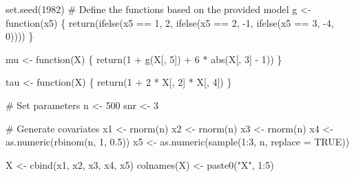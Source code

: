 \documentclass[
  letterpaper,
  DIV=11,
  numbers=noendperiod]{scrreprt}
\newenvironment{Shaded}{\begin{snugshade}}{\end{snugshade}}
\newcommand{\AttributeTok}[1]{\textcolor[rgb]{0.40,0.45,0.13}{#1}}
\newcommand{\CommentTok}[1]{\textcolor[rgb]{0.37,0.37,0.37}{#1}}
\newcommand{\ConstantTok}[1]{\textcolor[rgb]{0.56,0.35,0.01}{#1}}
\newcommand{\ControlFlowTok}[1]{\textcolor[rgb]{0.00,0.23,0.31}{#1}}
\newcommand{\DecValTok}[1]{\textcolor[rgb]{0.68,0.00,0.00}{#1}}
\newcommand{\FloatTok}[1]{\textcolor[rgb]{0.68,0.00,0.00}{#1}}
\newcommand{\FunctionTok}[1]{\textcolor[rgb]{0.28,0.35,0.67}{#1}}
\newcommand{\NormalTok}[1]{\textcolor[rgb]{0.00,0.23,0.31}{#1}}
\newcommand{\OtherTok}[1]{\textcolor[rgb]{0.00,0.23,0.31}{#1}}
\newcommand{\SpecialCharTok}[1]{\textcolor[rgb]{0.37,0.37,0.37}{#1}}
\newcommand{\StringTok}[1]{\textcolor[rgb]{0.13,0.47,0.30}{#1}}
\begin{document}
\begin{Shaded}
\begin{Highlighting}[]
\FunctionTok{set.seed}\NormalTok{(}\DecValTok{1982}\NormalTok{)}
\CommentTok{\# Define the functions based on the provided model}
\NormalTok{g }\OtherTok{\textless{}{-}} \ControlFlowTok{function}\NormalTok{(x5) \{}
  \FunctionTok{return}\NormalTok{(}\FunctionTok{ifelse}\NormalTok{(x5 }\SpecialCharTok{==} \DecValTok{1}\NormalTok{, }\DecValTok{2}\NormalTok{, }\FunctionTok{ifelse}\NormalTok{(x5 }\SpecialCharTok{==} \DecValTok{2}\NormalTok{, }\SpecialCharTok{{-}}\DecValTok{1}\NormalTok{, }\FunctionTok{ifelse}\NormalTok{(x5 }\SpecialCharTok{==} \DecValTok{3}\NormalTok{, }\SpecialCharTok{{-}}\DecValTok{4}\NormalTok{, }\DecValTok{0}\NormalTok{))))}
\NormalTok{\}}

\NormalTok{mu }\OtherTok{\textless{}{-}} \ControlFlowTok{function}\NormalTok{(X) \{}
  \FunctionTok{return}\NormalTok{(}\DecValTok{1} \SpecialCharTok{+} \FunctionTok{g}\NormalTok{(X[, }\DecValTok{5}\NormalTok{]) }\SpecialCharTok{+} \DecValTok{6} \SpecialCharTok{*} \FunctionTok{abs}\NormalTok{(X[, }\DecValTok{3}\NormalTok{] }\SpecialCharTok{{-}} \DecValTok{1}\NormalTok{))}
\NormalTok{\}}

\NormalTok{tau }\OtherTok{\textless{}{-}} \ControlFlowTok{function}\NormalTok{(X) \{}
  \FunctionTok{return}\NormalTok{(}\DecValTok{1} \SpecialCharTok{+} \DecValTok{2} \SpecialCharTok{*}\NormalTok{ X[, }\DecValTok{2}\NormalTok{] }\SpecialCharTok{*}\NormalTok{ X[, }\DecValTok{4}\NormalTok{])}
\NormalTok{\}}

\CommentTok{\# Set parameters}
\NormalTok{n }\OtherTok{\textless{}{-}} \DecValTok{500}
\NormalTok{snr }\OtherTok{\textless{}{-}} \DecValTok{3}

\CommentTok{\# Generate covariates}
\NormalTok{x1 }\OtherTok{\textless{}{-}} \FunctionTok{rnorm}\NormalTok{(n)}
\NormalTok{x2 }\OtherTok{\textless{}{-}} \FunctionTok{rnorm}\NormalTok{(n)}
\NormalTok{x3 }\OtherTok{\textless{}{-}} \FunctionTok{rnorm}\NormalTok{(n)}
\NormalTok{x4 }\OtherTok{\textless{}{-}} \FunctionTok{as.numeric}\NormalTok{(}\FunctionTok{rbinom}\NormalTok{(n, }\DecValTok{1}\NormalTok{, }\FloatTok{0.5}\NormalTok{))}
\NormalTok{x5 }\OtherTok{\textless{}{-}} \FunctionTok{as.numeric}\NormalTok{(}\FunctionTok{sample}\NormalTok{(}\DecValTok{1}\SpecialCharTok{:}\DecValTok{3}\NormalTok{, n, }\AttributeTok{replace =} \ConstantTok{TRUE}\NormalTok{))}

\NormalTok{X }\OtherTok{\textless{}{-}} \FunctionTok{cbind}\NormalTok{(x1, x2, x3, x4, x5)}
\FunctionTok{colnames}\NormalTok{(X) }\OtherTok{\textless{}{-}} \FunctionTok{paste0}\NormalTok{(}\StringTok{"X"}\NormalTok{, }\DecValTok{1}\SpecialCharTok{:}\DecValTok{5}\NormalTok{)}


\end{Highlighting}
\end{Shaded}
\end{document}

